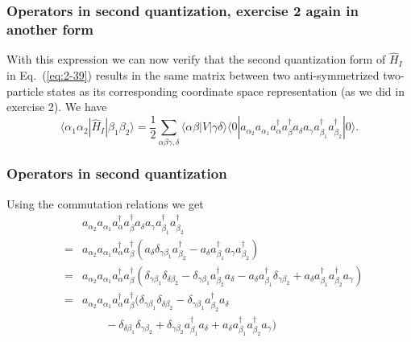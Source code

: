\documentclass[compress]{beamer}
\newcommand*{\ket}[1]{|#1\rangle}
\newcommand*{\bra}[1]{\langle#1|}
\newcommand{\element}[3]
        {\bra{#1}#2\ket{#3}}
\begin{document}
\frame
{
  \frametitle{Operators in second quantization, exercise 2 again in another form}
\begin{small}
{\scriptsize
With this expression we can now verify that the second quantization form of $\hat{H}_I$ in Eq.~(\ref{eq:2-39}) 
results in the same matrix between two anti-symmetrized two-particle states as its corresponding coordinate
space representation (as we did in exercise 2). We have  
\begin{equation}
	\element{\alpha_1 \alpha_2}{\hat{H}_I}{\beta_1 \beta_2} =
		\frac{1}{2} \sum_{\alpha\beta\gamma, \delta}
			\element{\alpha\beta}{V}{\gamma\delta} \element{0}{a_{\alpha_2} a_{\alpha_1} 
			 a^\dagger_\alpha a^\dagger_\beta a_\delta a_\gamma 
			 a_{\beta_1}^\dagger a_{\beta_2}^\dagger}{0}. \label{eq:2-40}
\end{equation}
}
\end{small}
}


\frame
{
  \frametitle{Operators in second quantization}
\begin{small}
{\scriptsize
Using the commutation relations we get 
\begin{eqnarray}
	&& a_{\alpha_2} a_{\alpha_1}a^\dagger_\alpha a^\dagger_\beta 
		a_\delta a_\gamma a_{\beta_1}^\dagger a_{\beta_2}^\dagger \nonumber \\
	&=& a_{\alpha_2} a_{\alpha_1}a^\dagger_\alpha a^\dagger_\beta 
		( a_\delta \delta_{\gamma \beta_1} a_{\beta_2}^\dagger - 
		a_\delta  a_{\beta_1}^\dagger a_\gamma a_{\beta_2}^\dagger ) \nonumber \\
	&=& a_{\alpha_2} a_{\alpha_1}a^\dagger_\alpha a^\dagger_\beta 
		(\delta_{\gamma \beta_1} \delta_{\delta \beta_2} - \delta_{\gamma \beta_1} a_{\beta_2}^\dagger a_\delta -
		a_\delta a_{\beta_1}^\dagger\delta_{\gamma \beta_2} +
		a_\delta a_{\beta_1}^\dagger a_{\beta_2}^\dagger a_\gamma ) \nonumber \\
	&=& a_{\alpha_2} a_{\alpha_1}a^\dagger_\alpha a^\dagger_\beta 
		(\delta_{\gamma \beta_1} \delta_{\delta \beta_2} - \delta_{\gamma \beta_1} a_{\beta_2}^\dagger a_\delta \nonumber \\
		&& \qquad - \delta_{\delta \beta_1} \delta_{\gamma \beta_2} + \delta_{\gamma \beta_2} a_{\beta_1}^\dagger a_\delta
		+ a_\delta a_{\beta_1}^\dagger a_{\beta_2}^\dagger a_\gamma ) \label{eq:2-41}
\end{eqnarray}
}
\end{small}
}
\end{document}
